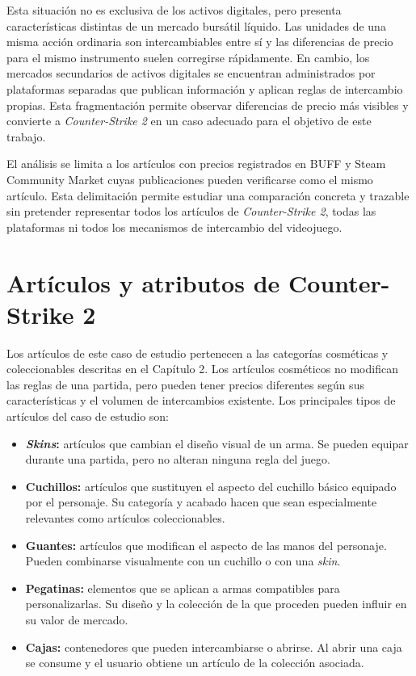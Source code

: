 \clearpage

Esta situación no es exclusiva de los activos digitales, pero presenta características distintas de un mercado bursátil líquido. Las unidades de una misma acción ordinaria son intercambiables entre sí y las diferencias de precio para el mismo instrumento suelen corregirse rápidamente. En cambio, los mercados secundarios de activos digitales se encuentran administrados por plataformas separadas que publican información y aplican reglas de intercambio propias. Esta fragmentación permite observar diferencias de precio más visibles y convierte a \textit{Counter-Strike 2} en un caso adecuado para el objetivo de este trabajo.

El análisis se limita a los artículos con precios registrados en BUFF y Steam Community Market cuyas publicaciones pueden verificarse como el mismo artículo. Esta delimitación permite estudiar una comparación concreta y trazable sin pretender representar todos los artículos de \textit{Counter-Strike 2}, todas las plataformas ni todos los mecanismos de intercambio del videojuego.

\section{Artículos y atributos de Counter-Strike 2}

Los artículos de este caso de estudio pertenecen a las categorías cosméticas y coleccionables descritas en el Capítulo 2. Los artículos cosméticos no modifican las reglas de una partida, pero pueden tener precios diferentes según sus características y el volumen de intercambios existente. Los principales tipos de artículos del caso de estudio son:
\begin{itemize}
    \item \textbf{\textit{Skins}:} artículos que cambian el diseño visual de un arma. Se pueden equipar durante una partida, pero no alteran ninguna regla del juego.
    \item \textbf{Cuchillos:} artículos que sustituyen el aspecto del cuchillo básico equipado por el personaje. Su categoría y acabado hacen que sean especialmente relevantes como artículos coleccionables.
    \item \textbf{Guantes:} artículos que modifican el aspecto de las manos del personaje. Pueden combinarse visualmente con un cuchillo o con una \textit{skin}.
    \item \textbf{Pegatinas:} elementos que se aplican a armas compatibles para personalizarlas. Su diseño y la colección de la que proceden pueden influir en su valor de mercado.
    \item \textbf{Cajas:} contenedores que pueden intercambiarse o abrirse. Al abrir una caja se consume y el usuario obtiene un artículo de la colección asociada.
\end{itemize}

